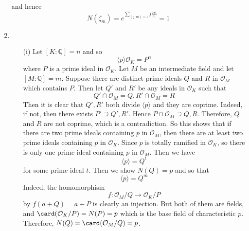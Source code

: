 \begin{enumerate}
and hence
$$N(\zeta_m)=e^{\sum_{(j,m)=1}j \frac{2\pi i}{m}}=1$$
\item
\begin{enumerate}
\item[(i)] Let $[K:\mathbb{Q}]=n$ and so
$$\langle p \rangle\mathcal{O}_K=P^n$$
where $P$ is a prime ideal in $\mathcal{O}_K$. Let $M$ be an intermediate field and let $[M:\mathbb{Q}]=m$.
Suppose there are distinct prime ideals $Q$ and $R$ in $\mathcal{O}_M$ which contains $P$. Then
let $Q'$ and $R'$ be any ideals in $\mathcal{O}_K$ such that
$$Q' \cap \mathcal{O}_M=Q, R' \cap \mathcal{O}_M=R$$
Then it is clear that $Q',R'$ both divide $\langle p \rangle$ and they are coprime. Indeed, if not, then
there exists $P' \supseteq Q',R'$. Hence $P \cap \mathcal{O}_M \supseteq Q,R$. Therefore, $Q$ and $R$ are not coprime, which is a contradiction. So this shows that if there are two prime ideals containing $p$ in $\mathcal{O}_M$, then there are at least two prime ideals containing $p$ in $\mathcal{O}_K$. Since
$p$ is totally ramified in $\mathcal{O}_K$, so there is only one prime ideal containing $p$ in
$\mathcal{O}_M$. Then we have
$$\langle p \rangle=Q^t$$
for some prime ideal $t$. Then we show $N(Q)=p$ and so that
$$\langle p \rangle=Q^m$$
Indeed, the homomorphism
$$f: \mathcal{O}_M/Q \rightarrow \mathcal{O}_K/P$$
by $f(a+Q)=a+P$ is clearly an injection. But both of them are fields, and
$\card(\mathcal{O}_K/P)=N(P)=p$ which is the base field of characteristic $p$. Therefore, $N(Q)=\card(\mathcal{O}_M/Q)=p$.


\end{enumerate}
\end{enumerate}
